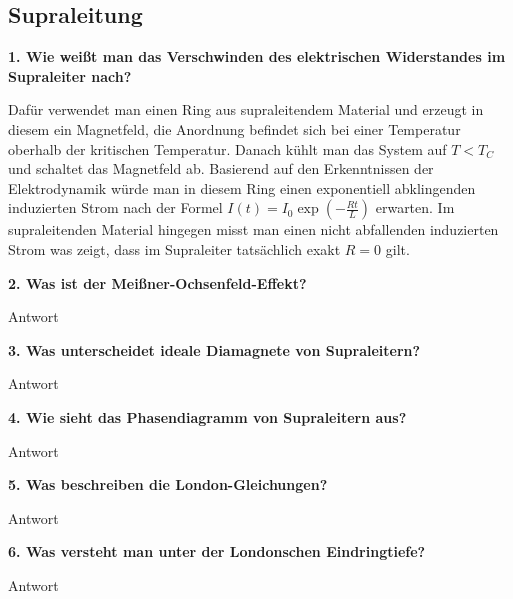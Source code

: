 \subsection{Supraleitung}
\noindent\textbf{1. Wie weißt man das Verschwinden des elektrischen Widerstandes im Supraleiter nach?}\\
\begin{addmargin}[25pt]{0pt}
Dafür verwendet man einen Ring aus supraleitendem Material und erzeugt in diesem ein Magnetfeld, die Anordnung befindet sich bei einer Temperatur oberhalb der kritischen Temperatur. Danach kühlt man das System auf $T<T_C$ und schaltet das Magnetfeld ab. Basierend auf den Erkenntnissen der Elektrodynamik würde man in diesem Ring einen exponentiell abklingenden induzierten Strom nach der Formel $I(t) = I_0 \exp\left(-\frac{Rt}{L}\right)$ erwarten. Im supraleitenden Material hingegen misst man einen nicht abfallenden induzierten Strom was zeigt, dass im Supraleiter tatsächlich exakt $R=0$ gilt. \\
\end{addmargin}

\noindent\textbf{2. Was ist der Meißner-Ochsenfeld-Effekt?}\\
\begin{addmargin}[25pt]{0pt}
Antwort\\
\end{addmargin}

\noindent\textbf{3. Was unterscheidet ideale Diamagnete von Supraleitern?}\\
\begin{addmargin}[25pt]{0pt}
Antwort\\
\end{addmargin}

\noindent\textbf{4. Wie sieht das Phasendiagramm von Supraleitern aus?}\\
\begin{addmargin}[25pt]{0pt}
Antwort\\
\end{addmargin}

\noindent\textbf{5. Was beschreiben die London-Gleichungen?}\\
\begin{addmargin}[25pt]{0pt}
Antwort\\
\end{addmargin}

\noindent\textbf{6. Was versteht man unter der Londonschen Eindringtiefe?}\\
\begin{addmargin}[25pt]{0pt}
Antwort\\
\end{addmargin}

